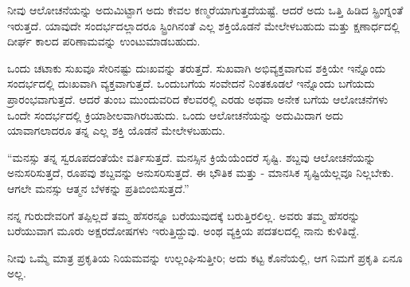 ನೀವು ಆಲೋಚನೆಯನ್ನು ಅದುಮಿಟ್ಟಾಗ ಅದು ಕೇವಲ ಕಣ್ಮರೆಯಾಗುತ್ತದೆಯಷ್ಟೆ. ಆದರೆ ಅದು ಒತ್ತಿ ಹಿಡಿದ ಸ್ಪ್ರಿಂಗ್ನಂತೆ ಇರುತ್ತದೆ. ಯಾವುದೇ ಸಂದರ್ಭದಲ್ಲಾದರೂ ಸ್ಟ್ರಿಂಗಿನಂತೆ ಎಲ್ಲ ಶಕ್ತಿಯೊಡನೆ ಮೇಲೇಳಬಹುದು ಮತ್ತು ಕ್ಷಣಾರ್ಧದಲ್ಲಿ ದೀರ್ಘ ಕಾಲದ ಪರಿಣಾಮವನ್ನು ಉಂಟುಮಾಡಬಹುದು.

ಒಂದು ಚಟಾಕು ಸುಖವೂ ಸೇರಿನಷ್ಟು ದುಃಖವನ್ನು ತರುತ್ತದೆ. ಸುಖವಾಗಿ ಅಭಿವ್ಯಕ್ತವಾಗುವ ಶಕ್ತಿಯೇ ಇನ್ನೊಂದು ಸಂದರ್ಭದಲ್ಲಿ ದುಃಖವಾಗಿ ವ್ಯಕ್ತವಾಗುತ್ತದೆ. ಒಂದುಬಗೆಯ ಸಂವೇದನೆ ನಿಂತಕೂಡಲೆ ಇನ್ನೊಂದು ಬಗೆಯದು ಪ್ರಾರಂಭವಾಗುತ್ತದೆ. ಆದರೆ ತುಂಬ ಮುಂದುವರಿದ ಕೆಲವರಲ್ಲಿ ಎರಡು ಅಥವಾ ಅನೇಕ ಬಗೆಯ ಆಲೋಚನೆಗಳು ಒಂದೇ ಸಂದರ್ಭದಲ್ಲಿ ಕ್ರಿಯಾಶೀಲವಾಗಿರಬಹುದು. ಒಂದು ಆಲೋಚನೆಯನ್ನು ಅದುಮಿದಾಗ ಅದು ಯಾವಾಗಲಾದರೂ ತನ್ನ ಎಲ್ಲ ಶಕ್ತಿ ಯೊಡನೆ ಮೇಲೇಳಬಹುದು.

“ಮನಸ್ಸು ತನ್ನ ಸ್ವರೂಪದಂತೆಯೇ ವರ್ತಿಸುತ್ತದೆ. ಮನಸ್ಸಿನ ಕ್ರಿಯೆಯೆಂದರೆ ಸೃಷ್ಟಿ. ಶಬ್ದವು ಆಲೋಚನೆಯನ್ನು ಅನುಸರಿಸುತ್ತದೆ, ರೂಪವು ಶಬ್ದವನ್ನು ಅನುಸರಿಸುತ್ತದೆ. ಈ ಭೌತಿಕ ಮತ್ತು - ಮಾನಸಿಕ ಸೃಷ್ಟಿಯೆಲ್ಲವೂ ನಿಲ್ಲಬೇಕು. ಆಗಲೇ ಮನಸ್ಸು ಆತ್ಮನ ಬೆಳಕನ್ನು ಪ್ರತಿಬಿಂಬಿಸುತ್ತದೆ.”

ನನ್ನ ಗುರುದೇವರಿಗೆ ತಪ್ಪಿಲ್ಲದೆ ತಮ್ಮ ಹೆಸರನ್ನೂ ಬರೆಯುವುದಕ್ಕೆ ಬರುತ್ತಿರಲಿಲ್ಲ. ಅವರು ತಮ್ಮ ಹೆಸರನ್ನು ಬರೆಯುವಾಗ ಮೂರು ಅಕ್ಷರದೋಷಗಳು ಇರುತ್ತಿದ್ದುವು. ಅಂಥ ವ್ಯಕ್ತಿಯ ಪದತಲದಲ್ಲಿ ನಾನು ಕುಳಿತಿದ್ದೆ.

ನೀವು ಒಮ್ಮೆ ಮಾತ್ರ ಪ್ರಕೃತಿಯ ನಿಯಮವನ್ನು ಉಲ್ಲಂಘಿಸುತ್ತೀರಿ; ಅದು ಕಟ್ಟ ಕೊನೆಯಲ್ಲಿ, ಆಗ ನಿಮಗೆ ಪ್ರಕೃತಿ ಏನೂ ಅಲ್ಲ.

